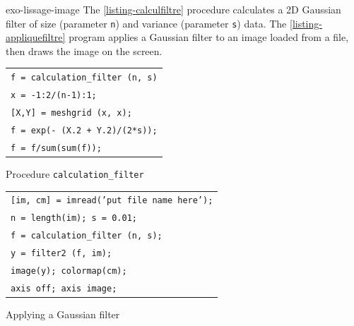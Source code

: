  
\begin{correction}{exo-lissage-image}
The \Matlab{} \ref{listing-calculfiltre} procedure calculates a 2D Gaussian filter of size (parameter \texttt{n}) and variance (parameter \texttt{s}) data. The \ref{listing-appliquefiltre} program applies a Gaussian filter to an image loaded from a file, then draws the image on the screen.

\begin{listing} 
\begin{footnotesize} 
{\upshape
\begin{tabular}{l} \texttt{\pfunction f = calculation\_filter (n, s)} \\
\texttt{x = -1:2/(n-1):1;} \\
\texttt{[X,Y] = meshgrid (x, x);} \\
\texttt{f = exp(- (X.{\hatverb}2 + Y.{\hatverb}2)/(2*s));} \\
\texttt{f = f/sum(sum(f));} \\
\end{tabular}
}
\end{footnotesize}
\caption{Procedure \texttt{\upshape calculation\_filter}}
\label{listing-calculfiltre}
\end{listing}
 
\begin{listing} 
\begin{footnotesize}
{\upshape
\begin{tabular}{l} \texttt{[im, cm] = imread('put file name here');} \\
\texttt{n = length(im); s = 0.01;} \\
\texttt{f = calculation\_filter (n, s);} \\
\texttt{y = filter2 (f, im);} \\
\texttt{image(y); colormap(cm);} \\
\texttt{axis off; axis image;} \\
\end{tabular}
}
\end{footnotesize}
\caption{Applying a Gaussian filter}
\label{listing-appliquefiltre}
\end{listing}
\end{correction}
 
